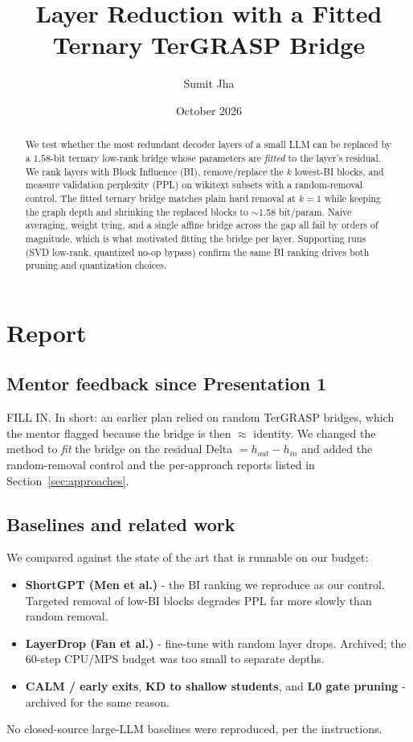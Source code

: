 \documentclass[11pt]{article}
\title{Layer Reduction with a Fitted Ternary TerGRASP Bridge}
\author{Sumit Jha}
\date{October 2026}
\begin{document}
\maketitle
\sloppy

\begin{abstract}
We test whether the most redundant decoder layers of a small LLM can be
replaced by a $1.58$-bit ternary low-rank bridge whose parameters are
\emph{fitted} to the layer's residual. We rank layers with Block Influence
(BI), remove/replace the $k$ lowest-BI blocks, and measure validation
perplexity (PPL) on wikitext subsets with a random-removal control. The
fitted ternary bridge matches plain hard removal at $k{=}1$ while keeping
the graph depth and shrinking the replaced blocks to $\sim$1.58 bit/param.
Naive averaging, weight tying, and a single affine bridge across the gap all
fail by orders of magnitude, which is what motivated fitting the bridge per
layer. Supporting runs (SVD low-rank, quantized no-op bypass) confirm the
same BI ranking drives both pruning and quantization choices.
\end{abstract}

\section{Report}
\subsection{Mentor feedback since Presentation 1}
FILL IN. In short: an earlier plan relied on random TerGRASP bridges, which
the mentor flagged because the bridge is then $\approx$ identity. We changed
the method to \emph{fit} the bridge on the residual Delta $= h_{out}-h_{in}$
and added the random-removal control and the per-approach reports listed in
Section~\ref{sec:approaches}.

\subsection{Baselines and related work}
We compared against the state of the art that is runnable on our budget:
\begin{itemize}
\item \textbf{ShortGPT (Men et al.)} - the BI ranking we reproduce as our
control. Targeted removal of low-BI blocks degrades PPL far more slowly
than random removal.
\item \textbf{LayerDrop (Fan et al.)} - fine-tune with random layer drops.
Archived; the 60-step CPU/MPS budget was too small to separate depths.
\item \textbf{CALM / early exits}, \textbf{KD to shallow students}, and
\textbf{L0 gate pruning} - archived for the same reason.
\end{itemize}
No closed-source large-LLM baselines were reproduced, per the instructions.
\end{document}
